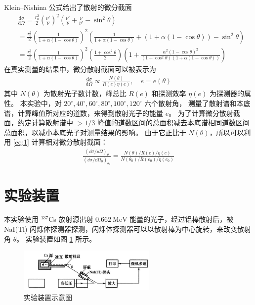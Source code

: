 \documentclass[revtex4-2]{mpltx}
\begin{document}
Klein–Nishina 公式给出了散射的微分截面
\begin{align*}
    &\frac{\mathrm{d}\sigma}{\mathrm{d}\Omega}=\frac{r_0^2}{2}\left(\frac{\nu'}{\nu}\right)^2\left(\frac{\nu'}{\nu}+\frac{\nu}{\nu'}-\sin^2\theta\right)\\
    &   =\frac{r_0^2}{2}\left(\frac{1}{1+\alpha(1-\cos\theta)}\right)^2
    \left(\frac{1}{1+\alpha(1-\cos\theta)}+(1+\alpha(1-\cos\theta))-\sin^2\theta\right)\\
    &   =\frac{r_0^2}{2}\left(\frac{1}{1+\alpha(1-\cos\theta)}\right)^2\left(\frac{1+\cos^2\theta}{2}\right)
    \left(1+\frac{\alpha^2(1-\cos\theta)^2}{(1+\cos^2\theta)(1+\alpha(1-\cos\theta))}\right)
\end{align*}
在真实测量的结果中，微分散射截面可以被表示为
\begin{align}
    \label{eq:1}\frac{\mathrm{d}\sigma}{\mathrm{d}\Omega}
    \propto\frac{N(\theta)}{R(e)\eta(e)},\quad e=e(\theta)
\end{align}
其中 $N(\theta)$ 为散射光子数计数，峰总比 $R(e)$ 和探测效率 $\eta(e)$ 为探测器的属性。
本实验中，对 $20^\circ,40^\circ,60^\circ,80^\circ,100^\circ,120^\circ$ 六个散射角，
测量了散射谱和本底谱，计算峰值所对应的道数，来得到散射光子的能量 $e$。
为了计算微分散射截面，约定计算散射谱中 $>1/3$ 峰值的道数区间的总面积减去本底谱相同道数区间总面积，以减小本底光子对测量结果的影响。
由于它正比于 $N(\theta)$，所以可以利用 \eqref{eq:1} 计算相对微分散射截面：
\begin{align}
    \label{eq:4}\frac{(\dd\sigma/\dd\Omega)_\theta}{(\dd\sigma/\dd\Omega_0)_{\theta_0}}=\frac{N(\theta)/R(e)/\eta(e)}{N(\theta_0)/R(e_0)/\eta(e_0)}
\end{align}
\section{实验装置}
本实验使用 ${}^{137}$Cs 放射源出射 $0.662\ \mathrm{MeV}$ 能量的光子，经过铝棒散射后，被 NaI(Tl) 闪烁体探测器探测，闪烁体探测器可以以散射棒为中心旋转，来改变散射角 $\theta$。
实验装置如图 \ref{fig:1} 所示。
\begin{figure}[htbp]
    \centering
    \includegraphics[width=0.6\textwidth]{1.png}
    \caption{实验装置示意图}
    \label{fig:1}
\end{figure}
\end{document}
